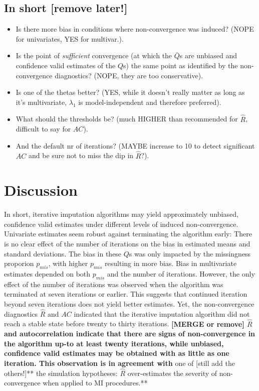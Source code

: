 \documentclass[Royal,times,sageh]{sagej}
\begin{document}
\hypertarget{in-short-remove-later}{%
\subsection{In short {[}remove later!{]}}\label{in-short-remove-later}}

\begin{itemize}
\item
  Is there more bias in conditions where non-convergence was induced? (NOPE for univariates, YES for multivar.).
\item
  Is the point of \emph{sufficient} convergence (at which the \(\bar{Q}\)s are unbiased and confidence valid estimates of the \(Q\)s) the same point as identified by the non-convergence diagnostics? (NOPE, they are too conservative).
\item
  Is one of the thetas better? (YES, while it doesn't really matter as long as it's multivariate, \(\lambda_1\) is model-independent and therefore preferred).
\item
  What should the thresholds be? (much HIGHER than recommended for \(\widehat{R}\), difficult to say for \(AC\)).
\item
  And the default nr of iterations? (MAYBE increase to 10 to detect significant \(AC\) and be sure not to miss the dip in \(\widehat{R}\)?).
\end{itemize}

\hypertarget{discussion}{%
\section{Discussion}\label{discussion}}

In short, iterative imputation algorithms may yield approximately unbiased, confidence valid estimates under different levels of induced non-convergence. Univariate estimates seem robust against terminating the algorithm early: There is no clear effect of the number of iterations on the bias in estimated means and standard deviations. The bias in these \(Q\)s was only impacted by the missingness proporion \(p_{mis}\), with higher \(p_{mis}\) resulting in more bias. Bias in multivariate estimates depended on both \(p_{mis}\) and the number of iterations. However, the only effect of the number of iterations was observed when the algorithm was terminated at seven iterations or earlier. This suggests that continued iteration beyond seven iterations does not yield better estimates. Yet, the non-convergence diagnostics \(\widehat{R}\) and \(AC\) indicated that the iterative imputation algorithm did not reach a stable state before twenty to thirty iterations. \textbf{{[}MERGE or remove{]} \(\widehat{R}\) and autocorrelation indicate that there are signs of non-convergence in the algorithm up-to at least twenty iterations, while unbiased, confidence valid estimates may be obtained with as little as one iteration. This observation is in agreement with }one of {[}still add the others!{]}** the simulation hypotheses: \(\widehat{R}\) over-estimates the severity of non-convergence when applied to MI procedures.**
\end{document}
